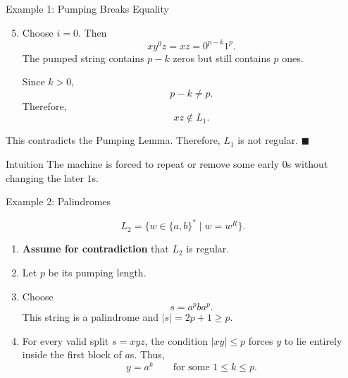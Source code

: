 \documentclass[10pt,aspectratio=169]{beamer}
\begin{document}
\begin{frame}{Example 1: Pumping Breaks Equality}

\small
\begin{enumerate}
    \setcounter{enumi}{4}
    \item Choose $i=0$. Then
    \[
    xy^0z=xz=0^{p-k}1^p.
    \]
    The pumped string contains $p-k$ zeros but still contains $p$ ones.

    Since $k>0$,
    \[
    p-k\neq p.
    \]
    Therefore,
    \[
    xz\notin L_1.
    \]
\end{enumerate}

This contradicts the Pumping Lemma. Therefore, $L_1$ is not regular.
\hfill $\blacksquare$

\vspace{0.7em}
\begin{block}{Intuition}
The machine is forced to repeat or remove some early $0$s without changing the later $1$s.
\end{block}

\end{frame}

\begin{frame}{Example 2: Palindromes}

\small
\[
L_2=\{w\in\{a,b\}^*\mid w=w^R\}.
\]

\begin{enumerate}
    \item \textbf{Assume for contradiction} that $L_2$ is regular.
    \item Let $p$ be its pumping length.
    \item Choose
    \[
    s=a^pba^p.
    \]
    This string is a palindrome and $|s|=2p+1\geq p$.
    \item For every valid split $s=xyz$, the condition $|xy|\leq p$ forces $y$ to lie entirely inside the first block of $a$s. Thus,
    \[
    y=a^k\qquad\text{for some }1\leq k\leq p.
    \]
\end{enumerate}

\end{frame}
\end{document}
